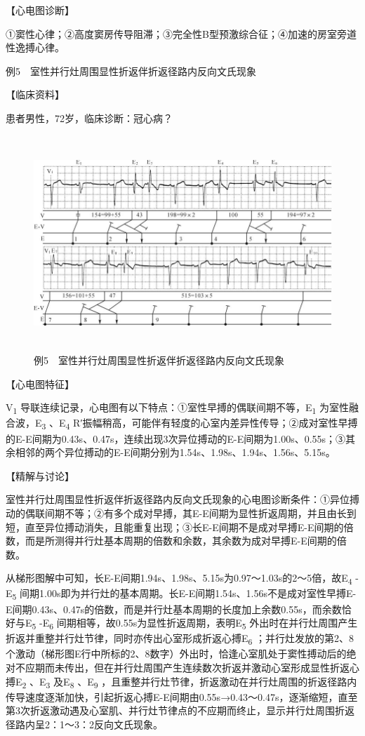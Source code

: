 【心电图诊断】

①窦性心律；②高度窦房传导阻滞；③完全性B型预激综合征；④加速的房室旁道性逸搏心律。

例5　室性并行灶周围显性折返伴折返径路内反向文氏现象

【临床资料】

患者男性，72岁，临床诊断：冠心病？

\begin{figure}[!htbp]
 \centering
 \includegraphics[width=5.77083in,height=3.19792in]{./images/Image00763.jpg}
 \captionsetup{justification=centering}
 \caption{例5　室性并行灶周围显性折返伴折返径路内反向文氏现象}
 \label{fig50-5}
  \end{figure} 

【心电图特征】

V\textsubscript{1}
导联连续记录，心电图有以下特点：①室性早搏的偶联间期不等，E\textsubscript{1}
为室性融合波，E\textsubscript{3} 、E\textsubscript{4}
R′振幅稍高，可能伴有轻度的心室内差异性传导；②成对室性早搏的E-E间期为0.43s、0.47s，连续出现3次异位搏动的E-E间期为1.00s、0.55s；③其余相邻的两个异位搏动的E-E间期分别为1.54s、1.98s、1.94s、1.56s、5.15s。

【精解与讨论】

室性并行灶周围显性折返伴折返径路内反向文氏现象的心电图诊断条件：①异位搏动的偶联间期不等；②有多个成对早搏，其E-E间期为显性折返周期，并且由长到短，直至异位搏动消失，且能重复出现；③长E-E间期不是成对早搏E-E间期的倍数，而是所测得并行灶基本周期的倍数和余数，其余数为成对早搏E-E间期的倍数。

从梯形图解中可知，长E-E间期1.94s、1.98s、5.15s为0.97～1.03s的2～5倍，故E\textsubscript{4}
-E\textsubscript{5}
间期1.00s即为并行灶的基本周期。长E-E间期1.54s、1.56s不是成对室性早搏E-E间期0.43s、0.47s的倍数，而是并行灶基本周期的长度加上余数0.55s，而余数恰好与E\textsubscript{5}
-E\textsubscript{6}
间期相等，故0.55s为显性折返周期，表明E\textsubscript{5}
外出时在并行灶周围产生折返并重整并行灶节律，同时亦传出心室形成折返心搏E\textsubscript{6}
；并行灶发放的第2、8个激动（梯形图E行中所标的2、8数字）外出时，恰逢心室肌处于窦性搏动后的绝对不应期而未传出，但在并行灶周围产生连续数次折返并激动心室形成显性折返心搏E\textsubscript{2}
、E\textsubscript{3} 及E\textsubscript{8} 、E\textsubscript{9}
，且重整并行灶节律，折返激动在并行灶周围的折返径路内传导速度逐渐加快，引起折返心搏E-E间期由0.55s→0.43～0.47s，逐渐缩短，直至第3次折返激动遇及心室肌、并行灶节律点的不应期而终止，显示并行灶周围折返径路内呈2：1～3：2反向文氏现象。

